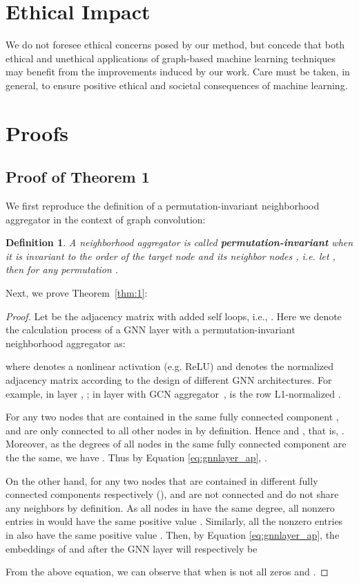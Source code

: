 \documentclass[letterpaper]{article} \usepackage{aaai21}  \usepackage{times}  \usepackage{helvet} \usepackage{courier}  \usepackage[hyphens]{url}  \usepackage{graphicx} \urlstyle{rm} \def\UrlFont{\rm}  \usepackage{natbib}  \usepackage{caption} \frenchspacing  \setlength{\pdfpagewidth}{8.5in}  \setlength{\pdfpageheight}{11in}
\newtheorem{dfn}{Definition}
\begin{document}
\section*{Ethical Impact}




We do not foresee ethical concerns posed by our method, but concede that both ethical and unethical applications of graph-based machine learning techniques may benefit from the improvements induced by our work. Care must be taken, in general, to ensure positive ethical and societal consequences of machine learning.




\clearpage

\appendix
\section{Proofs}
\subsection{Proof of Theorem 1}
\label{appn:proof}
We first reproduce the definition of a permutation-invariant neighborhood aggregator \cite{xu2018powerful} in the context of graph convolution:

\begin{dfn}
A neighborhood aggregator  is called \textbf{permutation-invariant} when it is invariant to the order of the target node and its neighbor nodes , i.e. let , then for any permutation .
\end{dfn}


Next, we prove Theorem~\ref{thm:1}:
\begin{proof}
Let  be the adjacency matrix with added self loops, i.e., . Here we denote the calculation process of a GNN layer with a permutation-invariant neighborhood aggregator as: 

where  denotes a nonlinear activation (e.g. ReLU) and  denotes the normalized adjacency matrix according to the design of different GNN architectures. For example, in \gcn layer \cite{kipf2016semi}, ; in \gsage layer with GCN aggregator~\cite{hamilton2017inductive},  is the row L1-normalized .

For any two nodes  that are contained in the same fully connected component ,  and  are only connected to all other nodes in  by definition. Hence  and , that is, . Moreover, as the degrees of all nodes in the same fully connected component are the the same, we have . Thus by Equation \ref{eq:gnnlayer_ap}, .

On the other hand, for any two nodes  that are contained in different fully connected components  respectively (),  and  are not connected and do not share any neighbors by definition. As all nodes in  have the same degree, all nonzero entries in  would have the same positive value . Similarly, all the nonzero entries in  also have the same positive value . Then, by Equation \ref{eq:gnnlayer_ap}, the embeddings of  and  after the GNN layer will respectively be 

From the above equation, we can observe that  when  is not all zeros and .
\end{proof}
\end{document}

